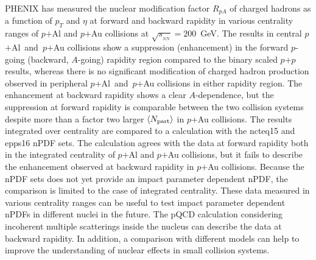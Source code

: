 \documentclass[twocolumn,letterpaper,aps,prc,longbibliography,superscriptaddress,nofootinbib,floatfix]{revtex4-2}
\newcommand{\pt}{\mbox{$p_T$}\xspace}
\newcommand{\rpa}{\mbox{$R_{pA}$}\xspace}
\newcommand{\npart}{\mbox{$\langle N_{\rm part} \rangle$}\xspace}
\newcommand{\sqsntwo}{\mbox{$\sqrt{s_{_{NN}}}=200$~GeV}\xspace}
\newcommand{\pp}{\mbox{$p$+$p$}\xspace}
\newcommand{\pau}{\mbox{$p$$+$Au}\xspace}
\newcommand{\pal}{\mbox{$p$$+$Al}\xspace}
\newcommand{\palau}{\mbox{$p$$+$Al and $p$$+$Au}\xspace}
\newcommand{\ncteq}{\mbox{n{\sc cteq15}}\xspace}
\newcommand{\epps}{\mbox{{\sc epps16}}\xspace}
\begin{document}
PHENIX has measured the nuclear modification factor \rpa of charged 
hadrons as a function of \pt and $\eta$ at forward and backward rapidity 
in various centrality ranges of \pal and \pau collisions at \sqsntwo. 
The results in central \palau collisions show a suppression 
(enhancement) in the forward $p$-going (backward, $A$-going) rapidity 
region compared to the binary scaled \pp results, whereas there is no 
significant modification of charged hadron production observed in 
peripheral \palau collisions in either rapidity region. The enhancement 
at backward rapidity shows a clear $A$-dependence, but the suppression 
at forward rapidity is comparable between the two collision systems 
despite more than a factor two larger \npart in \pau collisions. The 
results integrated over centrality are compared to a calculation with 
the \ncteq and \epps nPDF sets. The calculation agrees with the data 
at forward rapidity both in the integrated centrality of \pal and \pau 
collisions, but it fails to describe the enhancement observed at 
backward rapidity in \pau collisions. Because the nPDF sets does not yet 
provide an impact parameter dependent nPDF, the comparison is limited to 
the case of integrated centrality. These data measured in various 
centrality ranges can be useful to test impact parameter dependent nPDFs 
in different nuclei in the future. The pQCD calculation considering 
incoherent multiple scatterings inside the nucleus can describe the data 
at backward rapidity. In addition, a comparison with different models 
can help to improve the understanding of nuclear effects in small 
collision systems.


\end{document}
